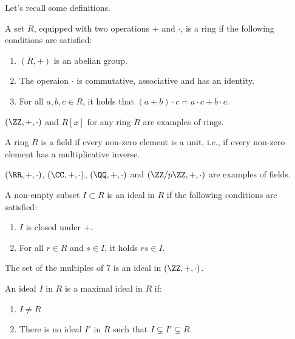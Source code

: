 
Let's recall some definitions.

\begin{defn}[Ring]
	A set $R$, equipped with two operations $+$ and $\cdot$, is a ring if the following conditions are satisfied:
	\begin{enumerate}
		\item $(R, +)$ is an abelian group.
		\item The operaion  $\cdot$ is commutative, associative and has an identity.
		\item For all $a, b, c \in R$, it holds that $(a + b) \cdot c = a \cdot c + b \cdot c$.
	\end{enumerate}
\end{defn}

\begin{exmp}[Rings]
	$(\ZZ, +, \cdot)$ and $R[x]$ for any ring $R$ are examples of rings.
\end{exmp}

\begin{defn}[Field]
	A ring $R$ is a field if every non-zero element is a unit, i.e., if every non-zero element has a multiplicative inverse.
\end{defn}

\begin{exmp}[Fields]
	$(\RR, +, \cdot)$,  $(\CC, +, \cdot)$, $(\QQ, +, \cdot)$ and $(\ZZ/p\ZZ, +, \cdot)$ are examples of fields.
\end{exmp}

\begin{defn}
	A non-empty subset $I \subset R$ is an ideal in $R$ if the following conditions are satisfied:
	\begin{enumerate}
		\item $I$ is closed under $+$.
		\item For all $r \in R$ and $s \in I$, it holds $rs \in I$.
	\end{enumerate}
\end{defn}

\begin{exmp}[Ideal]
	The set of the multiples of $7$ is an ideal in $(\ZZ, +, \cdot)$.
\end{exmp}

\begin{defn}
	An ideal $I$ in $R$ is a maximal ideal in $R$ if:
	\begin{enumerate}
		\item $I \neq R$
		\item There is no ideal $I'$ in $R$ such that $I \subsetneq I' \subsetneq R$.
	\end{enumerate}
\end{defn}

